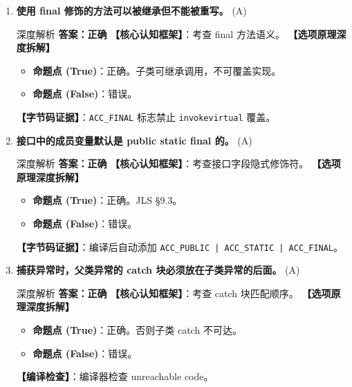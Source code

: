 ﻿\documentclass[12pt, a4paper]{ctexart}
\newcommand{\code}[1]{\texttt{#1}}
\newcommand{\tfblank}{\underline{\hspace{1.5em}}}
\begin{document}
\begin{enumerate}[label=\textbf{\arabic*.}, itemsep=1em]
	\item \textbf{使用 final 修饰的方法可以被继承但不能被重写。} \tfblank (A)
	      \begin{bluebox}{深度解析}
		      \textbf{答案：正确}
		      \textbf{【核心认知框架】}：考查 final 方法语义。
		      \textbf{【选项原理深度拆解】}
		      \begin{itemize}[leftmargin=*, nosep]
			      \item \textbf{命题点 (True)}：正确。子类可继承调用，不可覆盖实现。
			      \item \textbf{命题点 (False)}：错误。
		      \end{itemize}
		      \textbf{【字节码证据】}：\code{ACC\_FINAL} 标志禁止 \code{invokevirtual} 覆盖。
	      \end{bluebox}

	\item \textbf{接口中的成员变量默认是 public static final 的。} \tfblank (A)
	      \begin{bluebox}{深度解析}
		      \textbf{答案：正确}
		      \textbf{【核心认知框架】}：考查接口字段隐式修饰符。
		      \textbf{【选项原理深度拆解】}
		      \begin{itemize}[leftmargin=*, nosep]
			      \item \textbf{命题点 (True)}：正确。JLS §9.3。
			      \item \textbf{命题点 (False)}：错误。
		      \end{itemize}
		      \textbf{【字节码证据】}：编译后自动添加 \code{ACC\_PUBLIC | ACC\_STATIC | ACC\_FINAL}。
	      \end{bluebox}

	\item \textbf{捕获异常时，父类异常的 catch 块必须放在子类异常的后面。} \tfblank (A)
	      \begin{bluebox}{深度解析}
		      \textbf{答案：正确}
		      \textbf{【核心认知框架】}：考查 catch 块匹配顺序。
		      \textbf{【选项原理深度拆解】}
		      \begin{itemize}[leftmargin=*, nosep]
			      \item \textbf{命题点 (True)}：正确。否则子类 catch 不可达。
			      \item \textbf{命题点 (False)}：错误。
		      \end{itemize}
		      \textbf{【编译检查】}：编译器检查 unreachable code。
	      \end{bluebox}


\end{enumerate}
\end{document}
